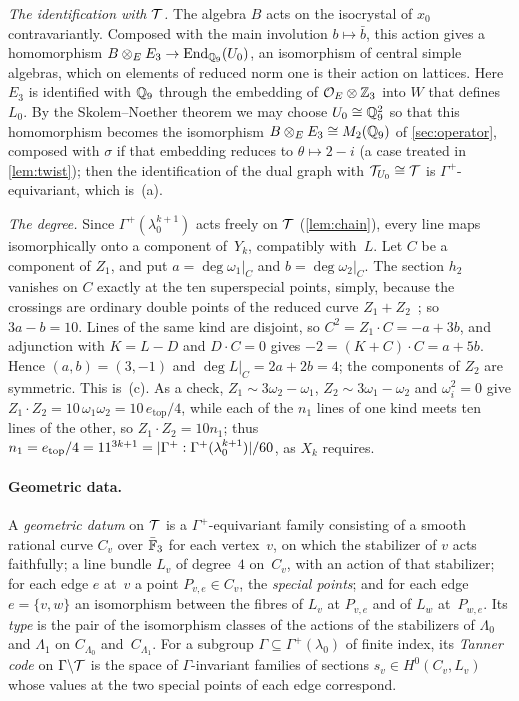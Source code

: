 \begin{informalproof}
\emph{The identification with $\mathcal{T}$.} The algebra $B$ acts on the isocrystal of $x_0$ contravariantly. Composed with
the main involution $b\mapsto\bar b$, this action gives a homomorphism $B\otimes_EE_3\to\operatorname{End}_{\mathbb{Q}_9}(U_0)$, an
isomorphism of central simple algebras, which on elements of reduced norm one is their action on lattices. Here $E_3$ is
identified with $\mathbb{Q}_9$ through the embedding of $\mathcal{O}_E\otimes\mathbb{Z}_3$ into $W$ that defines~$L_0$. By the Skolem--Noether
theorem we may choose $U_0\cong\mathbb{Q}_9^2$ so that this homomorphism becomes the isomorphism $B\otimes_EE_3\cong M_2(\mathbb{Q}_9)$ of
\cref{sec:operator}, composed with $\sigma$ if that embedding reduces to $\theta\mapsto2-i$ (a case treated in
\cref{lem:twist}); then the identification of the dual graph with $\mathcal{T}_{U_0}\cong\mathcal{T}$ is $\Gamma^+$-equivariant, which
is~(a).

\emph{The degree.} Since $\Gamma^+(\lambda_0^{k+1})$ acts freely on $\mathcal{T}$ (\cref{lem:chain}), every line maps
isomorphically onto a component of~$Y_k$, compatibly with~$L$. Let $C$ be a component of $Z_1$, and put
$a=\deg\omega_1|_C$ and $b=\deg\omega_2|_C$. The section $h_2$ vanishes on $C$ exactly at the ten superspecial points, simply,
because the crossings are ordinary double points of the reduced curve $Z_1+Z_2$~\cite[Theorem~6.1]{BachmatGoren1999}; so
$3a-b=10$. Lines of the same kind are disjoint, so $C^2=Z_1\cdot C=-a+3b$, and adjunction with $K=L-D$ and $D\cdot C=0$
gives $-2=(K+C)\cdot C=a+5b$. Hence $(a,b)=(3,-1)$ and $\deg L|_C=2a+2b=4$; the components of $Z_2$ are symmetric. This
is~(c). As a check, $Z_1\sim3\omega_2-\omega_1$, $Z_2\sim3\omega_1-\omega_2$ and $\omega_i^2=0$ give
$Z_1\cdot Z_2=10\,\omega_1\omega_2=10\,e_{\mathrm{top}}/4$, while each of the $n_1$ lines of one kind meets ten lines of the
other, so $Z_1\cdot Z_2=10n_1$; thus $n_1=e_{\mathrm{top}}/4=11^{3k+1}=\lvert \Gamma^+:\Gamma^+(\lambda_0^{k+1}) \rvert/60$, as $X_k$
requires.
\end{informalproof}

\paragraph{Geometric data.} A \emph{geometric datum} on $\mathcal{T}$ is a $\Gamma^+$-equivariant family consisting of a smooth
rational curve $C_v$ over $\bar{\mathbb{F}}_3$ for each vertex~$v$, on which the stabilizer of $v$ acts faithfully; a line bundle
$L_v$ of degree~$4$ on~$C_v$, with an action of that stabilizer; for each edge $e$ at~$v$ a point $P_{v,e}\in C_v$, the
\emph{special points}; and for each edge $e=\{v,w\}$ an isomorphism between the fibres of $L_v$ at $P_{v,e}$ and of $L_w$
at~$P_{w,e}$. Its \emph{type} is the pair of the isomorphism classes of the actions of the stabilizers of $\Lambda_0$ and
$\Lambda_1$ on $C_{\Lambda_0}$ and~$C_{\Lambda_1}$. For a subgroup $\Gamma\subseteq\Gamma^+(\lambda_0)$ of finite index,
its \emph{Tanner code} on $\Gamma\backslash\mathcal{T}$ is the space of $\Gamma$-invariant families of sections
$s_v\in H^0(C_v,L_v)$ whose values at the two special points of each edge correspond.

